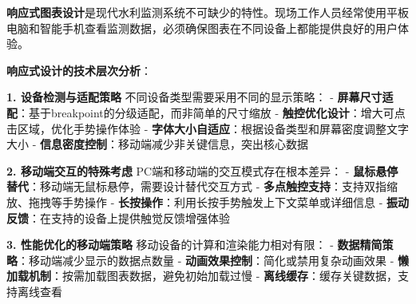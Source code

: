 \textbf{响应式图表设计}是现代水利监测系统不可缺少的特性。现场工作人员经常使用平板电脑和智能手机查看监测数据，必须确保图表在不同设备上都能提供良好的用户体验。

\textbf{响应式设计的技术层次分析}：

\textbf{1. 设备检测与适配策略} 不同设备类型需要采用不同的显示策略： - \textbf{屏幕尺寸适配}：基于breakpoint的分级适配，而非简单的尺寸缩放 - \textbf{触控优化设计}：增大可点击区域，优化手势操作体验 - \textbf{字体大小自适应}：根据设备类型和屏幕密度调整文字大小 - \textbf{信息密度控制}：移动端减少非关键信息，突出核心数据

\textbf{2. 移动端交互的特殊考虑} PC端和移动端的交互模式存在根本差异： - \textbf{鼠标悬停替代}：移动端无鼠标悬停，需要设计替代交互方式 - \textbf{多点触控支持}：支持双指缩放、拖拽等手势操作 - \textbf{长按操作}：利用长按手势触发上下文菜单或详细信息 - \textbf{振动反馈}：在支持的设备上提供触觉反馈增强体验

\textbf{3. 性能优化的移动端策略} 移动设备的计算和渲染能力相对有限： - \textbf{数据精简策略}：移动端减少显示的数据点数量 - \textbf{动画效果控制}：简化或禁用复杂动画效果 - \textbf{懒加载机制}：按需加载图表数据，避免初始加载过慢 - \textbf{离线缓存}：缓存关键数据，支持离线查看

